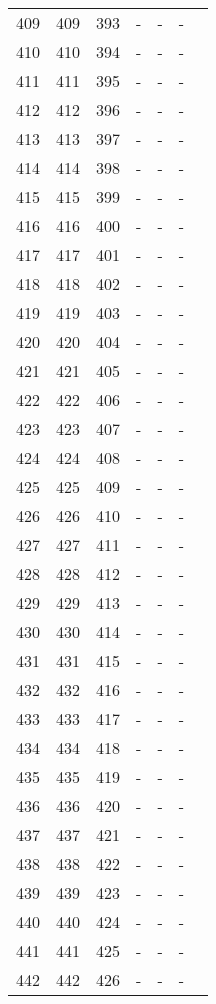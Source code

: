 \begin{longtable}{rrrllll}
  409 & 409 & 393 & - & - & - &  \\ 
  410 & 410 & 394 & - & - & - &  \\ 
  411 & 411 & 395 & - & - & - &  \\ 
  412 & 412 & 396 & - & - & - &  \\ 
  413 & 413 & 397 & - & - & - &  \\ 
  414 & 414 & 398 & - & - & - &  \\ 
  415 & 415 & 399 & - & - & - &  \\ 
  416 & 416 & 400 & - & - & - &  \\ 
  417 & 417 & 401 & - & - & - &  \\ 
  418 & 418 & 402 & - & - & - &  \\ 
  419 & 419 & 403 & - & - & - &  \\ 
  420 & 420 & 404 & - & - & - &  \\ 
  421 & 421 & 405 & - & - & - &  \\ 
  422 & 422 & 406 & - & - & - &  \\ 
  423 & 423 & 407 & - & - & - &  \\ 
  424 & 424 & 408 & - & - & - &  \\ 
  425 & 425 & 409 & - & - & - &  \\ 
  426 & 426 & 410 & - & - & - &  \\ 
  427 & 427 & 411 & - & - & - &  \\ 
  428 & 428 & 412 & - & - & - &  \\ 
  429 & 429 & 413 & - & - & - &  \\ 
  430 & 430 & 414 & - & - & - &  \\ 
  431 & 431 & 415 & - & - & - &  \\ 
  432 & 432 & 416 & - & - & - &  \\ 
  433 & 433 & 417 & - & - & - &  \\ 
  434 & 434 & 418 & - & - & - &  \\ 
  435 & 435 & 419 & - & - & - &  \\ 
  436 & 436 & 420 & - & - & - &  \\ 
  437 & 437 & 421 & - & - & - &  \\ 
  438 & 438 & 422 & - & - & - &  \\ 
  439 & 439 & 423 & - & - & - &  \\ 
  440 & 440 & 424 & - & - & - &  \\ 
  441 & 441 & 425 & - & - & - &  \\ 
  442 & 442 & 426 & - & - & - &  \\ 

\end{longtable}
